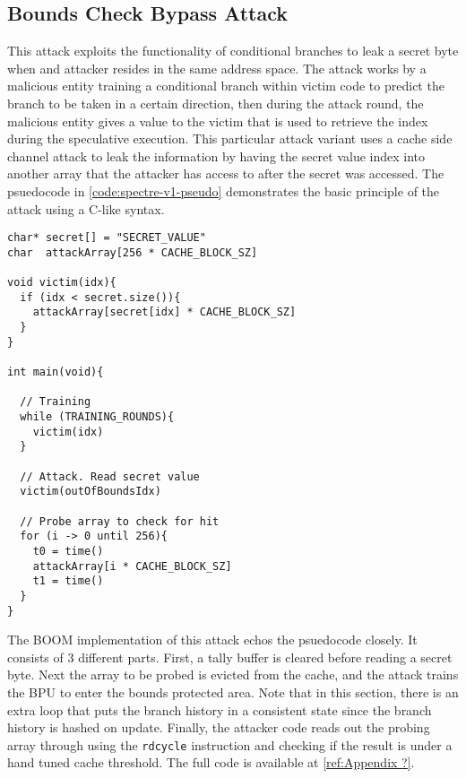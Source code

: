 \subsection{Bounds Check Bypass Attack}

This attack exploits the functionality of conditional branches to leak a secret byte 
when and attacker resides in the same address space. The attack works by a 
malicious entity training a conditional branch within victim code to predict the branch
to be taken in a certain direction, then during the attack round, the malicious entity
gives a value to the victim that is used to retrieve the index during the speculative
execution. This particular attack variant uses a cache side channel attack to leak the
information by having the secret value index into another array that the attacker has
access to after the secret was accessed. The psuedocode in \ref{code:spectre-v1-pseudo}
demonstrates the basic principle of the attack using a C-like syntax.

\begin{lstlisting}[style=column-code, caption=Psuedocode of Bounds Check Bypass Attack]
char* secret[] = "SECRET_VALUE"
char  attackArray[256 * CACHE_BLOCK_SZ]

void victim(idx){
  if (idx < secret.size()){
    attackArray[secret[idx] * CACHE_BLOCK_SZ]
  }
}

int main(void){
  
  // Training
  while (TRAINING_ROUNDS){
    victim(idx)
  }

  // Attack. Read secret value
  victim(outOfBoundsIdx)

  // Probe array to check for hit
  for (i -> 0 until 256){
    t0 = time()
    attackArray[i * CACHE_BLOCK_SZ]
    t1 = time()
  }
}
\end{lstlisting}\label{code:spectre-v1-pseudo}

The BOOM implementation of this attack echos the psuedocode closely. It consists of 3
different parts. First, a tally buffer is cleared before reading a secret byte. Next the
array to be probed is evicted from the cache, and the attack trains the BPU to enter the 
bounds protected area. Note that in this section, there is an extra loop that puts the 
branch history in a consistent state since the branch history is hashed on update. Finally,
the attacker code reads out the probing array through using the {\tt rdcycle} instruction and 
checking if the result is under a hand tuned cache threshold. The full code is available at
\ref{ref:Appendix ?}.

